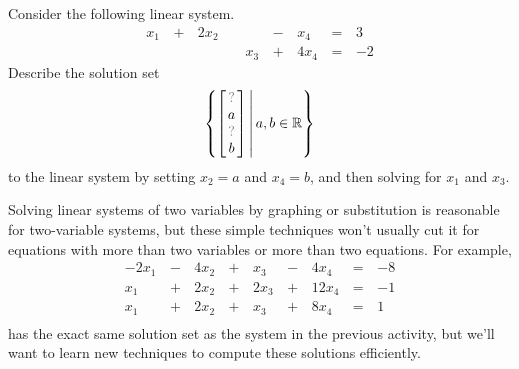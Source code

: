\begin{activity}{10}
  Consider the following linear system.
  \begin{alignat*}{5}
    x_1 &\,+\,& 2x_2 &\, \,&     &\,-\,&  x_4 &\,=\,& 3 \\
        &\, \,&      &\, \,& x_3 &\,+\,& 4x_4 &\,=\,& -2
  \end{alignat*}
  Describe the solution set
  \[
  	\setBuilder
    {
    	\begin{bmatrix}
          \unknown \\
          a \\
          \unknown \\
          b
    	\end{bmatrix}
    }{
      a,b \in \IR
    }
  \]
  to the linear system
  by setting \(x_2=a\) and \(x_4=b\), and then solving for \(x_1\) and
  \(x_3\).
\end{activity}

\begin{observation}
  Solving linear systems of two variables by graphing or substitution is
  reasonable for two-variable systems, but these simple techniques
  won't usually cut it for equations with
  more than two variables or more than two equations. For example,
  \begin{alignat*}{5}
    -2x_1 &\,-\,& 4x_2 &\,+\,&  x_3 &\,-\,&  4x_4 &\,=\,& -8 \\
      x_1 &\,+\,& 2x_2 &\,+\,& 2x_3 &\,+\,& 12x_4 &\,=\,& -1 \\
      x_1 &\,+\,& 2x_2 &\,+\,&  x_3 &\,+\,&  8x_4 &\,=\,&  1 \\
  \end{alignat*}
  has the exact same solution set as the system in the previous
  activity, but we'll want to learn new techniques
  to compute these solutions efficiently.
\end{observation}





